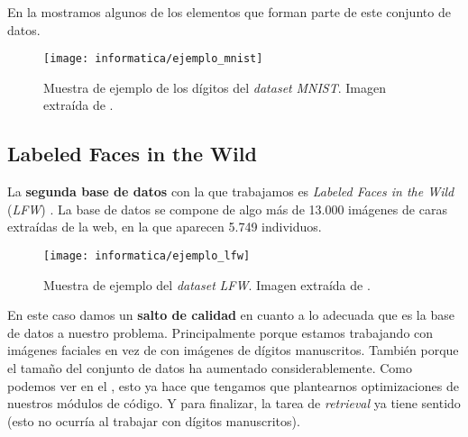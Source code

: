 En la  mostramos algunos de los elementos que forman parte de este conjunto de datos.

\begin{figure}[!hbtp]
    \centering
    \texttt{[image: informatica/ejemplo\_mnist]}
    \caption{Muestra de ejemplo de los dígitos del \textit{dataset} \textit{MNIST}. Imagen extraída de \cite{informatica:mnist_papers_with_code}.}
    \label{img:ejemplo_mnist_img}
\end{figure}

\subsection{Labeled Faces in the Wild}

La \textbf{segunda base de datos} con la que trabajamos es \textit{Labeled Faces in the Wild} (\textit{LFW}) \cite{informatica:lfw_dataset}. La base de datos se compone de algo más de 13.000 imágenes de caras extraídas de la web, en la que aparecen 5.749 individuos.

\begin{figure}[!hbtp]
    \centering
    \texttt{[image: informatica/ejemplo\_lfw]}
    \caption{Muestra de ejemplo del \textit{dataset} \textit{LFW}. Imagen extraída de \cite{informatica:papers_with_code_lfw}.}
    \label{img:ejemplo_lfw_imagen}
\end{figure}

En este caso damos un \textbf{salto de calidad} en cuanto a lo adecuada que es la base de datos a nuestro problema. Principalmente porque estamos trabajando con imágenes faciales en vez de con imágenes de dígitos manuscritos. También porque el tamaño del conjunto de datos ha aumentado considerablemente. Como podemos ver en el , esto ya hace que tengamos que plantearnos optimizaciones de nuestros módulos de código. Y para finalizar, la tarea de \textit{retrieval} ya tiene sentido (esto no ocurría al trabajar con dígitos manuscritos).

